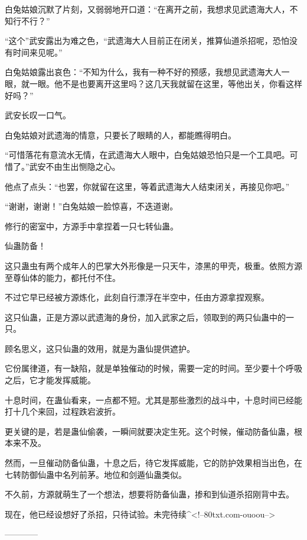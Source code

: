 \begin{this_body}
白兔姑娘沉默了片刻，又弱弱地开口道：“在离开之前，我想求见武遗海大人，不知行不行？”

“这个”武安露出为难之色，“武遗海大人目前正在闭关，推算仙道杀招呢，恐怕没有时间来见呢。”

白兔姑娘露出哀色：“不知为什么，我有一种不好的预感，我想见武遗海大人一眼，就一眼。他不是也要离开这里吗？这几天我就留在这里，等他出关，你看这样好吗？”

武安长叹一口气。

白兔姑娘对武遗海的情意，只要长了眼睛的人，都能瞧得明白。

“可惜落花有意流水无情，在武遗海大人眼中，白兔姑娘恐怕只是一个工具吧。可惜了。”武安不由生出恻隐之心。

他点了点头：“也罢，你就留在这里，等着武遗海大人结束闭关，再接见你吧。”

“谢谢，谢谢！”白兔姑娘一脸惊喜，不迭道谢。

修行的密室中，方源手中拿捏着一只七转仙蛊。

仙蛊防备！

这只蛊虫有两个成年人的巴掌大外形像是一只天牛，漆黑的甲壳，极重。依照方源至尊仙体的能力，都托付不住。

不过它早已经被方源炼化，此刻自行漂浮在半空中，任由方源拿捏观察。

这只仙蛊，正是方源以武遗海的身份，加入武家之后，领取到的两只仙蛊中的一只。

顾名思义，这只仙蛊的效用，就是为蛊仙提供遮护。

它份属律道，有一缺陷，就是单独催动的时候，需要一定的时间。至少要十个呼吸之后，它才能发挥威能。

十息时间，在蛊仙看来，一点都不短。尤其是那些激烈的战斗中，十息时间已经能打十几个来回，过程跌宕波折。

更关键的是，若是蛊仙偷袭，一瞬间就要决定生死。这个时候，催动防备仙蛊，根本来不及。

然而，一旦催动防备仙蛊，十息之后，待它发挥威能，它的防护效果相当出色，在七转防御仙蛊中名列前茅。地位和剑遁仙蛊类似。

不久前，方源就萌生了一个想法，想要将防备仙蛊，掺和到仙道杀招刚背中去。

现在，他已经设想好了杀招，只待试验。未完待续\^{}<!--80txt.com-ouoou-->

------------

\end{this_body}

